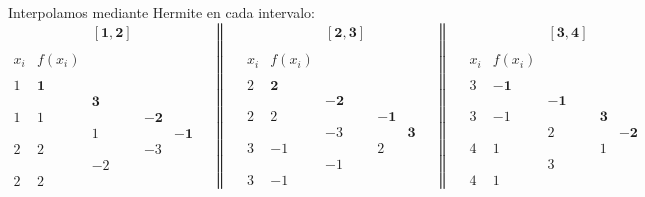 \begin{ejercicio}
    Interpolamos mediante Hermite en cada intervalo:
    \begin{equation*}
        \begin{array}{c|cccc}
            &&\mathbf{[1,2]} \\ \\
            x_i & f(x_i) \\ \\
            1 & \textbf{1} \\
            && \mathbf{3}\\
            1 & 1 && \mathbf{-2}\\
            && 1 && \mathbf{-1}\\ 
            2 & 2 && -3\\
            && -2\\
            2 & 2
        \end{array}
        \quad \left\|\quad
        \begin{array}{c|cccc}
            &&\mathbf{[2,3]} \\ \\
            x_i & f(x_i) \\ \\
            2 & \textbf{2} \\
            && \mathbf{-2}\\
            2 & 2 && \mathbf{-1}\\
            && -3 && \mathbf{3}\\ 
            3 & -1 && 2\\
            && -1\\
            3 & -1
        \end{array}\right.
        \quad \left\|\quad
        \begin{array}{c|cccc}
            &&\mathbf{[3, 4]} \\ \\
            x_i & f(x_i) \\ \\
            3 & \mathbf{-1} \\
            && \mathbf{-1}\\
            3 & -1 && \mathbf{3}\\
            && 2 && \mathbf{-2}\\ 
            4 & 1 && 1\\
            && 3\\
            4 & 1
        \end{array}\right.
    \end{equation*}


\end{ejercicio}
